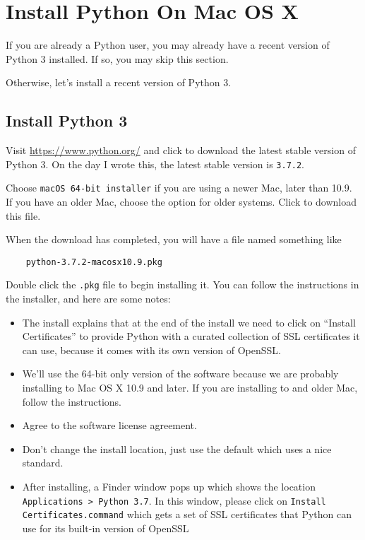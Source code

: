 \chapter{Install Python On Mac OS X}
\hypertarget{macosx-install-python}{}

If you are already a Python user, you may already have a recent
version of Python 3 installed. If so, you may skip this section.

Otherwise, let's install a recent version of Python 3.

\section{Install Python 3}


Visit \url{https://www.python.org/} and click to download the latest stable version
of Python 3. On the day I wrote this, the latest stable version
is \verb=3.7.2=.

Choose \verb=macOS 64-bit installer= if you are using a newer
Mac, later than 10.9. If you have an older Mac, choose the option
for older systems. Click to download this file.

When the download has completed, you will have a file named something like

\begin{verbatim}
    python-3.7.2-macosx10.9.pkg
\end{verbatim}

Double click the \verb=.pkg= file to begin installing it. You can
follow the instructions in the installer, and here are some notes:

\begin{itemize}

\item The install explains that at the end of the install we need
  to click on ``Install Certificates'' to provide Python with a
  curated collection of SSL certificates it can use, because it comes
  with its own version of OpenSSL.

\item We'll use the 64-bit only version of the software because
  we are probably installing to Mac OS X 10.9 and later. If you are
  installing to and older Mac, follow the instructions.

\item Agree to the software license agreement.

\item Don't change the install location, just use the default which
  uses a nice standard.

\item After installing, a Finder window pops up which shows the
  location \verb=Applications > Python 3.7=. In this window, please
  click on \verb=Install Certificates.command= which gets a set of
  SSL certificates that Python can use for its built-in version
  of OpenSSL

\end{itemize}

